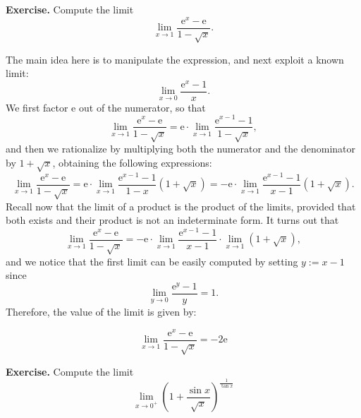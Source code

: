 \documentclass[a4paper,10 pt]{report}
\newcommand{\finalanswer}[1]{%
    \begin{finalAnswer}
    \[
        #1
    \]
    \end{finalAnswer}
}
\theoremstyle{definition}
\begin{document}
\begin{exerciseBox}
\textbf{Exercise.} Compute the limit
\begin{equation*} \lim_{x \to 1}  \frac{\mathrm{e}^x - \mathrm{e}}{1 - \sqrt{x}}. \end{equation*}
\end{exerciseBox}

\begin{solutionBox} 
The main idea here is to manipulate the expression, and next exploit a known limit:
\begin{equation*} \lim_{x \to 0} \frac{\mathrm{e}^x - 1}{x}.\end{equation*}
We first factor $\mathrm{e}$ out of the numerator, so that
\begin{equation*} \lim_{x \to 1}  \frac{\mathrm{e}^x - \mathrm{e}}{1 - \sqrt{x}} = \mathrm{e} \cdot \lim_{x \to 1} \frac{\mathrm{e}^{x-1} - 1}{1 - \sqrt{x}}, \end{equation*}
and then we rationalize by multiplying both the numerator and the denominator by $1 + \sqrt{x}$, obtaining the following expressions:
\begin{equation*} \lim_{x \to 1}  \frac{\mathrm{e}^x - \mathrm{e}}{1 - \sqrt{x}} = \mathrm{e} \cdot \lim_{x \to 1} \frac{\mathrm{e}^{x-1} - 1}{1 - x} \left(1 + \sqrt{x} \right) = - \mathrm{e} \cdot \lim_{x \to 1} \frac{\mathrm{e}^{x-1} - 1}{x - 1} \left(1 + \sqrt{x} \right). \end{equation*}
Recall now that the limit of a product is the product of the limits, provided that both exists and their product is not an indeterminate form. It turns out that
\begin{equation*} \lim_{x \to 1}  \frac{\mathrm{e}^x - \mathrm{e}}{1 - \sqrt{x}} = - \mathrm{e} \cdot \lim_{x \to 1} \frac{\mathrm{e}^{x-1} - 1}{x - 1} \cdot \lim_{x \to 1} \left(1 + \sqrt{x} \right), \end{equation*}
and we notice that the first limit can be easily computed by setting $y := x - 1$ since
\begin{equation*} \lim_{y \to 0} \frac{\mathrm{e}^{y} - 1}{y} = 1. \end{equation*}
Therefore, the value of the limit is given by:
\finalanswer{\lim_{x \to 1}  \frac{\mathrm{e}^x - \mathrm{e}}{1 - \sqrt{x}} = - 2\mathrm{e}}
\end{solutionBox}

\begin{exerciseBox}\textbf{Exercise.} Compute the limit
\begin{equation*} \lim_{x \to 0^+} \left( 1 + \frac{\sin x}{\sqrt{x}} \right)^{ \frac{1}{\tan x} } \end{equation*}
\end{exerciseBox}
\end{document}
